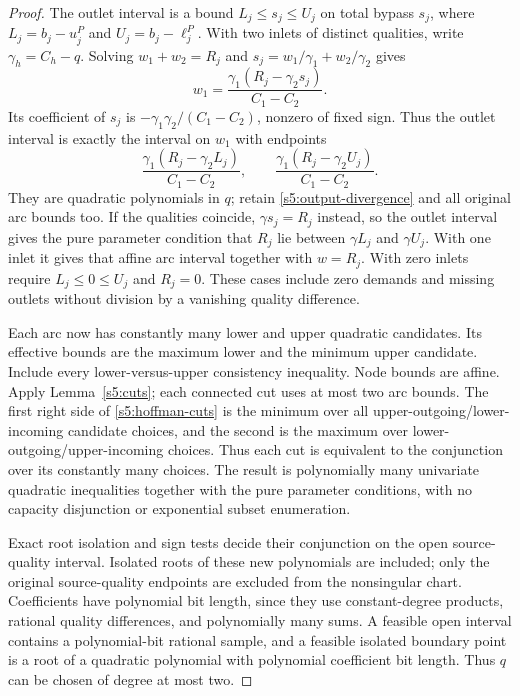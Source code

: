 \begin{proof}
The outlet interval is a bound $L_j\le s_j\le U_j$ on total bypass
$s_j$, where $L_j=b_j-u_j^P$ and $U_j=b_j-\ell_j^P$. With two inlets
of distinct qualities, write $\gamma_h=C_h-q$. Solving
$w_1+w_2=R_j$ and $s_j=w_1/\gamma_1+w_2/\gamma_2$ gives
\begin{equation}
 w_1=\frac{\gamma_1(R_j-\gamma_2s_j)}{C_1-C_2}.
 \label{s5:outlet-arc}
\end{equation}
Its coefficient of $s_j$ is
$-\gamma_1\gamma_2/(C_1-C_2)$, nonzero of fixed sign. Thus the outlet
interval is exactly the interval on $w_1$ with endpoints
\begin{equation}
 \frac{\gamma_1(R_j-\gamma_2L_j)}{C_1-C_2},\qquad
 \frac{\gamma_1(R_j-\gamma_2U_j)}{C_1-C_2}.
 \label{s5:quadratic-bounds}
\end{equation}
They are quadratic polynomials in $q$; retain
\eqref{s5:output-divergence} and all original arc bounds too.
If the qualities coincide, $\gamma s_j=R_j$ instead, so the outlet
interval gives the pure parameter condition that $R_j$ lie between
$\gamma L_j$ and $\gamma U_j$. With one inlet it gives that affine
arc interval together with $w=R_j$. With zero inlets require
$L_j\le0\le U_j$ and $R_j=0$. These cases include zero demands and
missing outlets without division by a vanishing quality difference.

Each arc now has constantly many lower and upper quadratic candidates.
Its effective bounds are the maximum lower and the minimum upper candidate.
Include every lower-versus-upper consistency inequality. Node bounds
are affine. Apply Lemma~\ref{s5:cuts}; each connected cut uses at most
two arc bounds. The first right side of \eqref{s5:hoffman-cuts} is the
minimum over all upper-outgoing/lower-incoming candidate choices, and the
second is the maximum over lower-outgoing/upper-incoming choices.
Thus each cut is equivalent to the conjunction over its constantly
many choices. The result is polynomially many univariate quadratic
inequalities together with the pure parameter conditions, with no capacity disjunction
or exponential subset enumeration.

Exact root isolation and sign tests decide their conjunction on the
open source-quality interval. Isolated roots of these new
polynomials are included; only the original source-quality endpoints are excluded
from the nonsingular chart. Coefficients have polynomial bit length,
since they use constant-degree products, rational quality differences,
and polynomially many sums. A feasible open interval contains a
polynomial-bit rational sample, and a feasible isolated boundary point is a
root of a quadratic polynomial with polynomial coefficient bit length. Thus $q$
can be chosen of degree at most two.


\end{proof}
